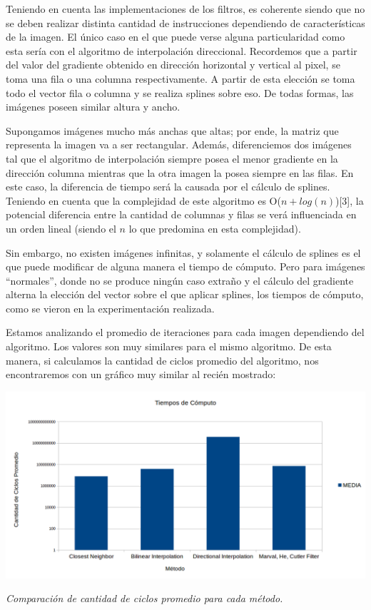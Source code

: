 \begin{itemize}
Teniendo en cuenta las implementaciones de los filtros, es coherente siendo que no se deben realizar distinta cantidad de instrucciones dependiendo de características de la imagen. El único caso en el que puede verse alguna particularidad como esta sería con el algoritmo de interpolación direccional. Recordemos que a partir del valor del gradiente obtenido en dirección horizontal y vertical al pixel, se toma una fila o una columna respectivamente. A partir de esta elección se toma todo el vector fila o columna y se realiza splines sobre eso. De todas formas, las imágenes poseen similar altura y ancho.

Supongamos imágenes mucho más anchas que altas; por ende, la matriz que representa la imagen va a ser rectangular. Además, diferenciemos dos imágenes tal que el algoritmo de interpolación siempre posea el menor gradiente en la dirección columna mientras que la otra imagen la posea siempre en las filas. En este caso, la diferencia de tiempo será la causada por el cálculo de splines. Teniendo en cuenta que la complejidad de este algoritmo es O($n + log(n)$)[3], la potencial diferencia entre la cantidad de columnas y filas se verá influenciada en un orden lineal (siendo el $n$ lo que predomina en esta complejidad).

Sin embargo, no existen imágenes infinitas, y solamente el cálculo de splines es el que puede modificar de alguna manera el tiempo de cómputo. Pero para imágenes ``normales'', donde no se produce ningún caso extraño y el cálculo del gradiente alterna la elección del vector sobre el que aplicar splines, los tiempos de cómputo, como se vieron en la experimentación realizada.


\vspace{2\baselineskip}

Estamos analizando el promedio de iteraciones para cada imagen dependiendo del algoritmo. Los valores son muy similares para el mismo algoritmo. De esta manera, si calculamos la cantidad de ciclos promedio del algoritmo, nos encontraremos con un gráfico muy similar al recién mostrado:

	\begin{center}
		\includegraphics[scale=0.4]{./img/tiemposDeComputo.png}
		\vspace{2pt}
		\par
		\footnotesize\textit{Comparación de cantidad de ciclos promedio para cada método.}
	\end{center}


\end{itemize}

